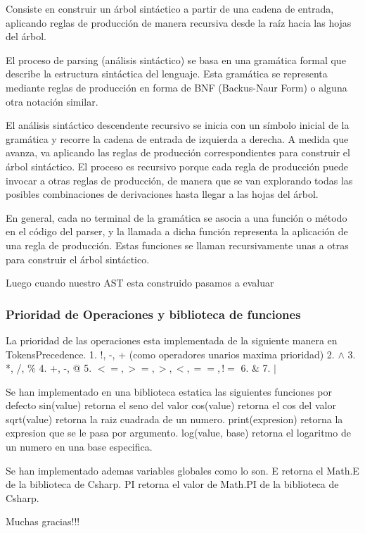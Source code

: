 \documentclass{beamer}
\begin{document}
\begin{frame}
Consiste en construir un árbol sintáctico a partir de una cadena de entrada, aplicando reglas de producción de manera recursiva desde la raíz hacia las hojas del árbol.

El proceso de parsing (análisis sintáctico) se basa en una gramática formal que describe la estructura sintáctica del lenguaje. Esta gramática se representa mediante reglas de producción en forma de BNF (Backus-Naur Form) o alguna otra notación similar.

El análisis sintáctico descendente recursivo se inicia con un símbolo inicial de la gramática y recorre la cadena de entrada de izquierda a derecha. A medida que avanza, va aplicando las reglas de producción correspondientes para construir el árbol sintáctico. El proceso es recursivo porque cada regla de producción puede invocar a otras reglas de producción, de manera que se van explorando todas las posibles combinaciones de derivaciones hasta llegar a las hojas del árbol.

En general, cada no terminal de la gramática se asocia a una función o método en el código del parser, y la llamada a dicha función representa la aplicación de una regla de producción. Estas funciones se llaman recursivamente unas a otras para construir el árbol sintáctico.

Luego cuando nuestro AST esta construido pasamos a evaluar
\end{frame}

\begin{frame}
\frametitle{Prioridad de Operaciones y biblioteca de funciones}
\begin{block}{1}
La prioridad de las operaciones esta implementada de la
siguiente manera en TokensPrecedence.
1. {!}, -, + (como operadores unarios maxima prioridad)
2. $\wedge$
3. {*}, /, \% 
4. +, -, @
5. $ <=, >=, >, < ,==, {!}= $
6. \& 
7. $\mid$ 
\end{block}

\begin{block}{2}
Se han implementado en una biblioteca estatica las siguientes funciones por defecto
sin(value) retorna el seno del valor
cos(value) retorna el cos del valor
sqrt(value) retorna la raiz cuadrada de un numero.
print(expresion) retorna la expresion que se le pasa
por argumento.
log(value, base) retorna el logaritmo de un numero en una base especifica.

\end{block}

\begin{block}{3}
    Se han implementado ademas variables globales como lo son.
    E retorna el Math.E de la biblioteca de Csharp.
    PI retorna el valor de Math.PI de la biblioteca de Csharp.
    \end{block}
\end{frame}

\begin{frame}
\Huge{\centerline{Muchas gracias!!!}}
\end{frame}
\end{document}
